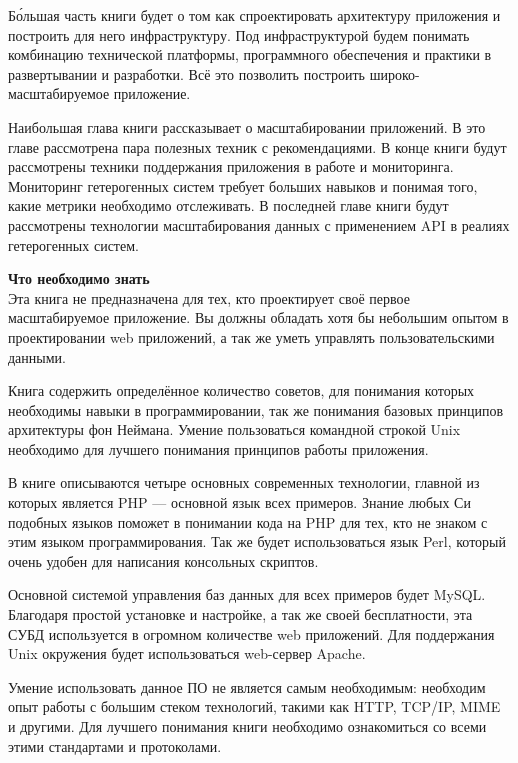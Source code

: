 Б\'{о}льшая часть книги будет о том как спроектировать архитектуру приложения и построить для него инфраструктуру. Под инфраструктурой будем понимать  комбинацию технической платформы, программного обеспечения и практики в развертывании и разработки. Всё это позволить построить широко-масштабируемое приложение.

Наибольшая глава книги рассказывает о масштабировании приложений.  В это главе рассмотрена пара полезных техник с рекомендациями. В конце книги будут рассмотрены техники поддержания приложения в работе и мониторинга. Мониторинг гетерогенных систем требует больших навыков и понимая того, какие метрики необходимо отслеживать. В последней главе книги будут рассмотрены  технологии масштабирования данных с применением API в реалиях гетерогенных систем.

\textbf{Что необходимо знать}\\

Эта книга не предназначена для тех, кто проектирует своё первое масштабируемое приложение. Вы должны обладать хотя бы небольшим опытом в проектировании web приложений, а так же уметь управлять пользовательскими данными.


Книга содержить определённое количество советов, для понимания которых необходимы навыки в программировании, так же понимания базовых принципов архитектуры фон Неймана. Умение пользоваться командной строкой Unix необходимо для лучшего понимания принципов работы приложения. 

В книге описываются четыре основных современных технологии, главной из которых является PHP --- основной язык всех примеров. Знание любых Си подобных языков поможет в понимании кода на PHP для тех, кто не знаком с этим языком программирования. Так же будет использоваться язык Perl, который очень удобен для написания  консольных скриптов.


Основной системой управления баз данных для всех примеров будет MySQL. Благодаря простой установке и настройке, а так же своей бесплатности, эта СУБД используется в огромном количестве web приложений. Для поддержания Unix окружения будет использоваться web-сервер Apache.

Умение использовать данное ПО не является самым необходимым: необходим опыт работы с большим стеком технологий, такими как HTTP, TCP/IP, MIME и другими. Для лучшего понимания книги необходимо ознакомиться со всеми этими стандартами и протоколами.


